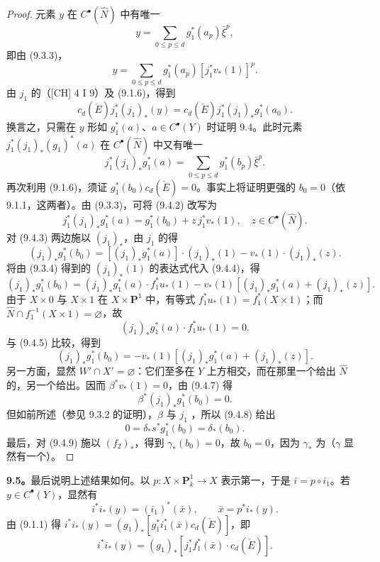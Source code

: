 \begin{proof}
元素 $y$ 在 $C^\bullet(\widehat N)$ 中有唯一
\[
 y=\sum_{0\le p\le d}g_1^*(a_p)\bar\xi^p,
\]
即由 (9.3.3)，
\[
 y=\sum_{0\le p\le d}g_1^*(a_p)[j_1^*v_*(1)]^p.\tag{9.4.1}
\]
由 $j_1$ 的（[CH] 4 I 9）及 (9.1.6)，得到
\[
 c_d(\check E)j_1^*(j_1)_*(y)=c_d(\check E)j_1^*(j_1)_*g_1^*(a_0).
\]
换言之，只需在 $y$ 形如 $g_1^*(a)$、$a\in C^\bullet(Y)$ 时证明 9.4。此时元素 $j_1^*(j_1)_*(g_1)^*(a)$ 在 $C^\bullet(\widehat N)$ 中又有唯一
\[
 j_1^*(j_1)_*g_1^*(a)=\sum_{0\le p\le d}g_1^*(b_p)\bar\xi^p.\tag{9.4.2}
\]
再次利用 (9.1.6)，须证 $g_1^*(b_0)c_d(\check E)=0$。事实上将证明更强的 $b_0=0$（依 9.1.1，这两者）。由 (9.3.3)，可将 (9.4.2) 改写为
\[
 j_1^*(j_1)_*g_1^*(a)=g_1^*(b_0)+z\,j_1^*v_*(1),\quad z\in C^\bullet(\widehat N).\tag{9.4.3}
\]
对 (9.4.3) 两边施以 $(j_1)_*$，由 $j_1$ 的得
\[
 (j_1)_*g_1^*(b_0)=[(j_1)_*g_1^*(a)]\cdot(j_1)_*(1)-v_*(1)\cdot(j_1)_*(z).
 \tag{9.4.4}
\]
将由 (9.3.4) 得到的 $(j_1)_*(1)$ 的表达式代入 (9.4.4)，得
\[
 (j_1)_*g_1^*(b_0)=(j_1)_*g_1^*(a)\cdot f_1^*u_*(1)
 -v_*(1)[(j_1)_*g_1^*(a)+(j_1)_*(z)].\tag{9.4.5}
\]
由于 $X\times0$ 与 $X\times1$ 在 $X\times\mathbf P^1$ 中，有等式 $f_1^*u_*(1)=f_1^*(X\times1)$；而 $\widehat N\cap f_1^{-1}(X\times1)=\varnothing$，故
\[
 (j_1)_*g_1^*(a)\cdot f_1^*u_*(1)=0.\tag{9.4.6}
\]
与 (9.4.5) 比较，得到
\[
 (j_1)_*g_1^*(b_0)=-v_*(1)[(j_1)_*g_1^*(a)+(j_1)_*(z)].\tag{9.4.7}
\]
另一方面，显然 $W'\cap X'=\varnothing$：它们至多在 $Y$ 上方相交，而在那里一个给出 $\widehat N$ 的，另一个给出。因而 $\beta^*v_*(1)=0$，由 (9.4.7) 得
\[
 \beta^*(j_1)_*g_1^*(b_0)=0.\tag{9.4.8}
\]
但如前所述（参见 9.3.2 的证明），$\beta$ 与 $j_1$ ，所以 (9.4.8) 给出
\[
 0=\delta_*s^*g_1^*(b_0)=\delta_*(b_0).\tag{9.4.9}
\]
最后，对 (9.4.9) 施以 $(f_2)_*$，得到 $\gamma_*(b_0)=0$，故 $b_0=0$，因为 $\gamma_*$ 为（$\gamma$ 显然有一个）。
\end{proof}
\textbf{9.5。}最后说明上述结果如何。以 $p:X\times\mathbf P_k^1\to X$ 表示第一，于是 $i=p\circ i_1$。若 $y\in C^\bullet(Y)$，显然有
\[
 i^*i_*(y)=(i_1)^*(\bar x),\qquad\bar x=p^*i_*(y).\tag{9.5.1}
\]
由 (9.1.1) 得 $i^*i_*(y)=(g_1)_*[g_1^*i_1^*(\bar x)c_d(\check E)]$，即
\[
 i^*i_*(y)=(g_1)_*[j_1^*f_1^*(\bar x)\cdot c_d(\check E)].\tag{9.5.2}
\]
